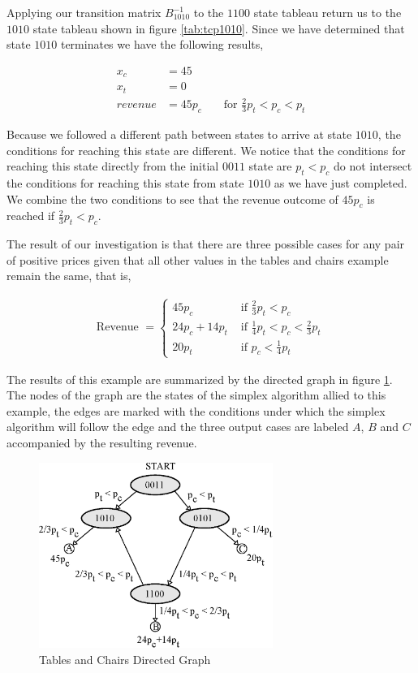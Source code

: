 Applying our transition matrix $B_{1010}^{-1}$ to the $1100$ state
tableau return us to the $1010$ state tableau shown in figure
\ref{tab:tcp1010}.  Since we have determined that state $1010$
terminates we have the following results,

\begin{align*}
x_c &= 45\\
x_t &= 0\\
revenue &= 45p_c && \text{ for } \frac{2}{3}p_t < p_c < p_t
\end{align*}

Because we followed a different path between states to arrive at state
$1010$, the conditions for reaching this state are different. We
notice that the conditions for reaching this state directly from the
initial $0011$ state are $p_t < p_c$ do not intersect the conditions
for reaching this state from state $1010$ as we have just
completed. We combine the two conditions to see that the revenue
outcome of $45p_c$ is reached if $\frac{2}{3}p_t < p_c$.

The result of our investigation is that there are three possible cases
for any pair of positive prices given that all other values in the
tables and chairs example remain the same, that is,

\begin{align*}
\text{Revenue } = \begin{cases}45p_c & \text{ if } \frac{2}{3}p_t < p_c\\
  24p_c + 14p_t & \text{ if } \frac{1}{4}p_t < p_c < \frac{2}{3}p_t\\
  20p_t & \text{ if } p_c < \frac{1}{4}p_t\end{cases}
\end{align*}

The results of this example are summarized by the directed graph in figure
\ref{fig:tc_directed_graph}. The nodes of the graph are the states of
the simplex algorithm allied to this example, the edges are marked
with the conditions under which the simplex algorithm will follow the
edge and the three output cases are labeled $A$, $B$ and $C$
accompanied by the resulting revenue.

\begin{figure}
  \centering
  \includegraphics[width=3in]{Images/tc_directed_graph}
  \caption[Tables and Chairs Directed Graph]
          {Tables and Chairs Directed Graph}
  \label{fig:tc_directed_graph}
\end{figure}

